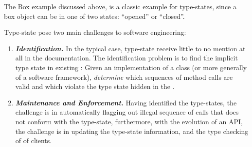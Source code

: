 The Box example discussed above, is a classic example for type-states,
  since a box object can be in one of two states: ``opened'' or ``closed''.

Type-state pose two main challenges to software engineering:
\begin{enumerate}
  \item \emph{\textbf{Identification.}}
    In the typical case, type-state
        receive little to no mention at all in the documentation.
    The identification problem is to find the implicit
    type state in existing \Java: Given an implementation of a class
    (or more generally of a software framework),
    \emph{determine} which sequences of method calls are valid and which violate the
    type state hidden in the \Java.
  \item \emph{\textbf{Maintenance and Enforcement.}}
    Having identified the type-states, the challenge is in automatically flagging out
      illegal sequence of calls that does not conform
      with the type-state, furthermore, with the
      evolution of an API, the challenge is in updating the type-state information,
      and the type checking of \Java of clients.
\end{enumerate}

